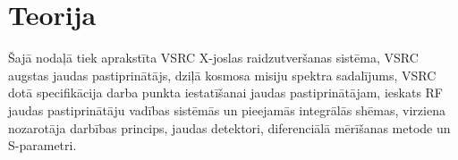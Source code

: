 \chapter{Teorija}
Šajā nodaļā tiek aprakstīta VSRC X-joslas raidzutveršanas sistēma, VSRC augstas jaudas pastiprinātājs, dziļā kosmosa misiju spektra sadalījums, VSRC dotā specifikācija darba punkta iestatīšanai jaudas pastiprinātājam, ieskats RF jaudas pastiprinātāju vadības sistēmās un pieejamās integrālās shēmas, virziena nozarotāja darbības princips, jaudas detektori, diferenciālā mērīšanas metode un S-parametri.



%







